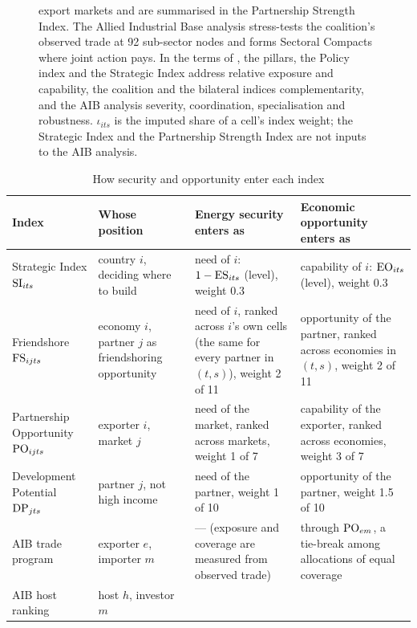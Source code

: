 \begin{figure}[tbp]
{  export markets and are
  summarised in the Partnership Strength Index. The Allied Industrial Base analysis stress-tests the
  coalition's observed trade at 92 sub-sector nodes and forms Sectoral Compacts where joint action
  pays. In the terms of \citet{neis2026allied}, the pillars, the Policy index and
  the Strategic Index address relative exposure and capability, the coalition and the bilateral indices
  complementarity, and the AIB analysis severity, coordination, specialisation and robustness. $\iota_{its}$
  is the imputed share of a cell's index weight; the Strategic Index and the Partnership Strength
  Index are not inputs to the AIB analysis.}
  \label{fig:framework_architecture}
\end{figure}

\begin{table}[tbp]
\centering
\begin{threeparttable}
\caption{How security and opportunity enter each index}
\label{tab:roles}
\footnotesize
\begin{tabularx}{\textwidth}{@{}>{\raggedright\arraybackslash}p{2.7cm}
  >{\raggedright\arraybackslash}p{2.4cm} >{\raggedright\arraybackslash}X
  >{\raggedright\arraybackslash}X@{}}
\toprule
Index & Whose position & Energy security enters as & Economic opportunity enters as\\
\midrule
Strategic Index $\mathrm{SI}_{its}$ & country $i$, deciding where to build &
  need of $i$: $1-\mathrm{ES}_{its}$ (level), weight 0.3 &
  capability of $i$: $\mathrm{EO}_{its}$ (level), weight 0.3\\[2pt]
Friendshore $\mathrm{FS}_{ijts}$ & economy $i$, partner $j$ as friendshoring opportunity &
  need of $i$, ranked across $i$'s own cells (the same for every partner in $(t,s)$), weight 2 of 11 &
  opportunity of the partner, ranked across economies in $(t,s)$, weight 2 of 11\\[2pt]
Partnership Opportunity $\mathrm{PO}_{ijts}$ & exporter $i$, market $j$ &
  need of the market, ranked across markets, weight 1 of 7 &
  capability of the exporter, ranked across economies, weight 3 of 7\\[2pt]
Development Potential $\mathrm{DP}_{jts}$ & partner $j$, not high income &
  need of the partner, weight 1 of 10 & opportunity of the partner, weight 1.5 of 10\\[2pt]
AIB trade program & exporter $e$, importer $m$ &
  --- (exposure and coverage are measured from observed trade) &
  through $\mathrm{PO}_{em}$, a tie-break among allocations of equal coverage\\[2pt]
AIB host ranking & host $h$, investor $m$ &

\end{tabularx}
\end{threeparttable}
\end{table}

